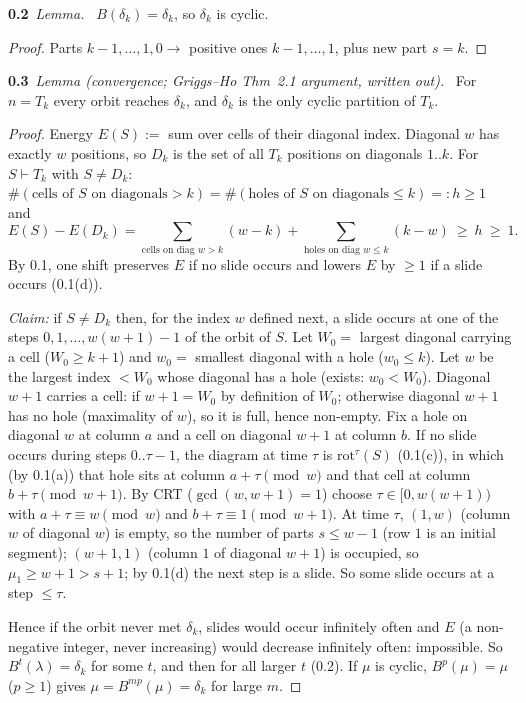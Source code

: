 \documentclass[11pt]{article}
\newcommand{\step}[2]{\par\medskip\noindent\textbf{#1}\ \textit{#2}\ }
\newcommand{\rot}{\mathrm{rot}}
\begin{document}
\step{0.2}{Lemma.} $B(\delta_k)=\delta_k$, so $\delta_k$ is cyclic.
\begin{proof} Parts $k-1,\ldots,1,0\to$ positive ones $k-1,\ldots,1$, plus new part $s=k$. \end{proof}

\step{0.3}{Lemma (convergence; Griggs--Ho Thm~2.1 argument, written out).} For $n=T_k$ every orbit reaches $\delta_k$, and $\delta_k$ is the only cyclic partition of $T_k$.
\begin{proof}
Energy $E(S):=$ sum over cells of their diagonal index. Diagonal $w$ has exactly $w$ positions, so $D_k$ is the set of all $T_k$ positions on diagonals $1..k$. For $S\vdash T_k$ with $S\ne D_k$: $\#(\text{cells of }S\text{ on diagonals}>k)=\#(\text{holes of }S\text{ on diagonals}\le k)=:h\ge1$ and
\[
E(S)-E(D_k)=\sum_{\text{cells on diag }w>k}(w-k)+\sum_{\text{holes on diag }w\le k}(k-w)\ \ge\ h\ \ge\ 1.
\]
By 0.1, one shift preserves $E$ if no slide occurs and lowers $E$ by $\ge1$ if a slide occurs (0.1(d)).

\emph{Claim:} if $S\ne D_k$ then, for the index $w$ defined next, a slide occurs at one of the steps $0,1,\ldots,w(w+1)-1$ of the orbit of $S$.
Let $W_0=$ largest diagonal carrying a cell ($W_0\ge k+1$) and $w_0=$ smallest diagonal with a hole ($w_0\le k$). Let $w$ be the largest index $<W_0$ whose diagonal has a hole (exists: $w_0<W_0$). Diagonal $w+1$ carries a cell: if $w+1=W_0$ by definition of $W_0$; otherwise diagonal $w+1$ has no hole (maximality of $w$), so it is full, hence non-empty. Fix a hole on diagonal $w$ at column $a$ and a cell on diagonal $w+1$ at column $b$. If no slide occurs during steps $0..\tau-1$, the diagram at time $\tau$ is $\rot^\tau(S)$ (0.1(c)), in which (by 0.1(a)) that hole sits at column $a+\tau\pmod w$ and that cell at column $b+\tau\pmod{w+1}$. By CRT ($\gcd(w,w+1)=1$) choose $\tau\in[0,w(w+1))$ with $a+\tau\equiv w\pmod w$ and $b+\tau\equiv1\pmod{w+1}$. At time $\tau$, $(1,w)$ (column $w$ of diagonal $w$) is empty, so the number of parts $s\le w-1$ (row $1$ is an initial segment); $(w+1,1)$ (column $1$ of diagonal $w+1$) is occupied, so $\mu_1\ge w+1>s+1$; by 0.1(d) the next step is a slide. So some slide occurs at a step $\le\tau$.

Hence if the orbit never met $\delta_k$, slides would occur infinitely often and $E$ (a non-negative integer, never increasing) would decrease infinitely often: impossible. So $B^t(\lambda)=\delta_k$ for some $t$, and then for all larger $t$ (0.2). If $\mu$ is cyclic, $B^p(\mu)=\mu$ ($p\ge1$) gives $\mu=B^{mp}(\mu)=\delta_k$ for large $m$.
\end{proof}
\end{document}
